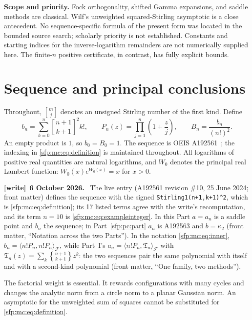 \documentclass[11pt,letterpaper]{article}
\numberwithin{equation}{section}
\theoremstyle{definition}\newtheorem{definition}[theorem]{Definition}
\theoremstyle{remark}\newtheorem{remark}[theorem]{Remark}
\newcommand{\sone}[2]{\genfrac{[}{]}{0pt}{}{#1}{#2}}
\newcommand{\stwo}[2]{\genfrac{\{} {\}}{0pt}{}{#1}{#2}}
\newcommand{\stir}{\sone}
\newenvironment{writenote}[1][]{\par\smallskip\begingroup\small
 \noindent\textbf{[write]}\if\relax\detokenize{#1}\relax\else~\textbf{#1.}\fi\ }%
 {\par\endgroup\smallskip}
\begin{document}
\noindent\textbf{Scope and priority.}
Fock orthogonality, shifted Gamma expansions, and saddle methods are
classical. Wilf's unweighted squared-Stirling asymptotic is a close
antecedent. No sequence-specific formula of the present form was
located in the bounded source search; scholarly priority is not
established. Constants and starting indices for the inverse-logarithm
remainders are not numerically supplied here. The finite-$n$ positive
certificate, in contrast, has fully explicit bounds.
\medskip


\section{Sequence and principal conclusions}\label{sfp:mc:sec:overview}

Throughout, $\stir{m}{j}$ denotes an unsigned Stirling number of the
first kind. Define
\begin{equation}\label{sfp:mc:eq:definition}
 b_n=\sum_{k=0}^{n}\stir{n+1}{k+1}^{\!2}k!,\qquad
 P_n(z)=\prod_{j=1}^{n}\left(1+\frac zj\right),\qquad
 B_n=\frac{b_n}{(n!)^2}.
\end{equation}
An empty product is $1$, so $b_0=B_0=1$.
The sequence is OEIS A192561~\cite{oeis}; the indexing in
\eqref{sfp:mc:eq:definition} is maintained throughout. All logarithms of
positive real quantities are natural logarithms, and $W_0$ denotes
the principal real Lambert function: $W_0(x)e^{W_0(x)}=x$ for $x>0$.
\begin{writenote}[6 October 2026]
The live entry (A192561 revision \#10, 25 June 2024; front matter) defines the sequence with the signed \verb!Stirling1(n+1,k+1)^2!, which is \eqref{sfp:mc:eq:definition}; its 17 listed terms agree with the write's recomputation, and its term $n=10$ is \eqref{sfp:mc:eq:exampleinteger}. In this Part $a=a_n$ is a saddle point and $b_n$ the sequence; in Part~\ref{sfp:pc:part} $a_n$ is A192563 and $b=\kappa_2$ (front matter, ``Notation across the two Parts''). In the notation \eqref{sfp:mc:eq:inner}, $b_n=\langle n!P_n,n!P_n\rangle_{\mathcal F}$, while Part~I's $a_n=\langle n!P_n,\mathfrak T_n\rangle_{\mathcal F}$ with $\mathfrak T_n(z)=\sum_k\stwo{n+1}{k+1}z^k$: the two sequences pair the same polynomial with itself and with a second-kind polynomial (front matter, ``One family, two methods'').
\end{writenote}

The factorial weight is essential. It rewards configurations with
many cycles and changes the analytic norm from a circle norm to a
planar Gaussian norm. An asymptotic for the unweighted sum of squares
cannot be substituted for \eqref{sfp:mc:eq:definition}.
\end{document}
